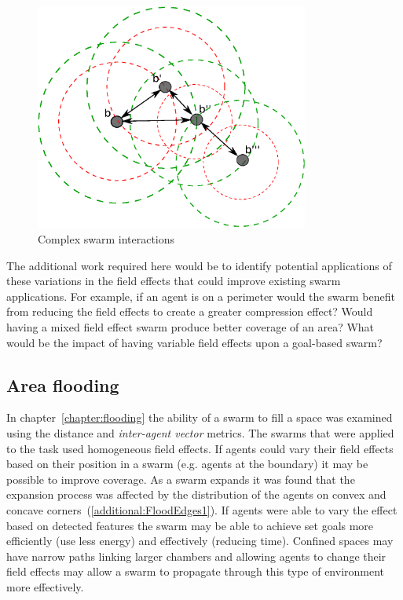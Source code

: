 \begin{figure}[H]
\begin{center}
\includegraphics[width=9cm]{CHAPTER-9/figures/FieldEffects2}
\end{center}
\caption{Complex swarm interactions\label{additional:FieldEffects2}}
\end{figure}

The additional work required here would be to identify potential applications of these variations in the field effects that could improve existing swarm applications. For example, if an agent is on a perimeter would the swarm benefit from reducing the field effects to create a greater compression effect? Would having a mixed field effect swarm produce better coverage of an area? What would be the impact of having variable field effects upon a goal-based swarm?

\subsection{Area flooding}
In chapter~\ref{chapter:flooding} the ability of a swarm to fill a space was examined using the distance and \textit{inter-agent vector} metrics. The swarms that were applied to the task used homogeneous field effects. If agents could vary their field effects based on their position in a swarm (e.g. agents at the boundary) it may be possible to improve coverage. As a swarm expands it was found that the expansion process was affected by the distribution of the agents on convex and concave corners~(\autoref{additional:FloodEdges1}). If agents were able to vary the effect based on detected features the swarm may be able to achieve set goals more efficiently (use less energy) and effectively (reducing time). Confined spaces may have narrow paths linking larger chambers and allowing agents to change their field effects may allow a swarm to propagate through this type of environment more effectively. 

